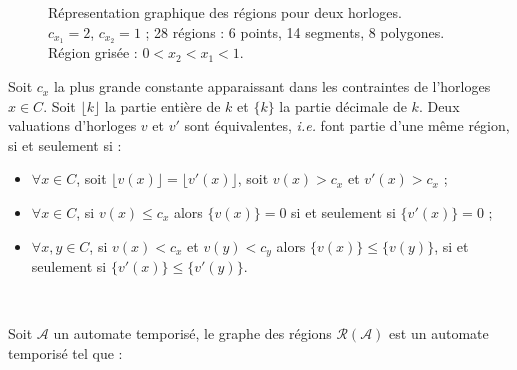 \documentclass{article}
\begin{document}
        \begin{figure}
          \centering
          \caption{Répresentation graphique des régions pour deux horloges. \\
            $c_{x_1} = 2$, $c_{x_2} = 1$ ; 28 régions : 6 points, 14 segments, 8
            polygones. \\ 
            Région grisée : $0 < x_2 < x_1 < 1$.}
          \label{fig:graphe-regions}
        \end{figure}

        Soit $c_x$ la plus grande constante apparaissant dans les contraintes de
        l'horloges $x \in C$. Soit $\lfloor k \rfloor$ la partie entière de $k$
        et $\{k\}$ la partie décimale de $k$. Deux valuations d'horloges $v$ et
        $v'$ sont équivalentes, {\it i.e.} font partie d'une même région, si et
        seulement si :

        \begin{itemize}
          \item $\forall x \in C$, soit $\lfloor v(x) \rfloor = \lfloor v'(x)
            \rfloor$, soit $v(x) > c_x$ et $v'(x) > c_x$ ;
          \item $\forall x \in C$, si $v(x) \le c_x$ alors $\{v(x)\} = 0$ si et
            seulement si $\{v'(x)\} = 0$ ;
          \item $\forall x, y \in C$, si $v(x) < c_x$ et $v(y) < c_y$ alors
            $\{v(x)\} \le \{v(y)\}$, si et seulement si $\{v'(x)\} \le
            \{v'(y)\}$.
        \end{itemize}

        ~

        Soit $\mathcal{A}$ un automate temporisé, le graphe des régions
        $\mathcal{R}(\mathcal{A})$ est un automate temporisé tel que :
      
\end{document}
